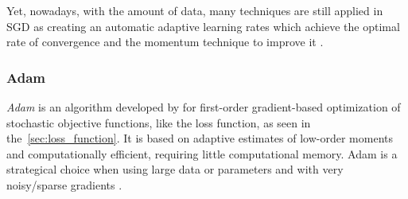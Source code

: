 Yet, nowadays, with the amount of data, many techniques are still applied in SGD as creating an automatic adaptive learning rates which achieve the optimal rate of convergence \cite{darken1991} and the momentum technique to improve it \cite{sutskever2013}.

\subsubsection*{Adam}

\emph{Adam} is an algorithm developed by \textcite{kingma2017} for first-order gradient-based optimization of stochastic objective functions, like the loss function, as seen in the~\cref{sec:loss_function}.
It is based on adaptive estimates of low-order moments and computationally efficient, requiring little computational memory.
Adam is a strategical choice when using large data or parameters and with very noisy/sparse gradients \cite{kingma2017}.



